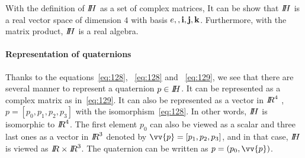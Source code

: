 With the definition of $\mbox{\rm $I\!\!H$}$ as a set of complex matrices, It can be show that $\mbox{\rm $I\!\!H$}$ is a real vector space of dimension $4$ with basis ${e, \bf, i, j, k}$. Furthermore, with the matrix product, $\mbox{\rm $I\!\!H$}$ is a real algebra.

\paragraph{Representation of quaternions} Thanks to the equations~\eqref{eq:128}, ~\eqref{eq:128} and ~\eqref{eq:129}, we see that there are several manner to represent a quaternion $p\in \mbox{\rm $I\!\!H$}$. It can be represented as a complex matrix as in~\eqref{eq:129}. It can also be represented as a vector in $\mbox{\rm $I\!\!R$}^4$ , $p= [p_0,p_1,p_2,p_3]$ with the isomorphism~\eqref{eq:128}. In other words,  $\mbox{\rm $I\!\!H$}$ is isomorphic to $\mbox{\rm $I\!\!R$}^4$.  The first element $p_0$ can also be viewed as  a scalar and three last ones as a vector in $\mbox{\rm $I\!\!R$}^3$ denoted by $\vv{p} = [p_1,p_2,p_3]$, and in that case, $\mbox{\rm $I\!\!H$}$ is viewed as $\mbox{\rm $I\!\!R$}\times \mbox{\rm $I\!\!R$}^3$. The quaternion can be written as $p=(p_0,\vv{p})$.

